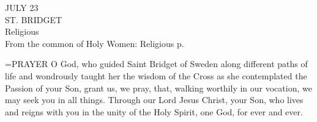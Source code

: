 \begin{center}\normalsize JULY 23\\
\footnotesize ST. BRIDGET\\
\footnotesize Religious\\
\footnotesize From the common of Holy Women: Religious p. \\
\end{center}

\hangindent=\parindent \small{PRAYER 
O God, who guided Saint Bridget of Sweden
along different paths of life
and wondrously taught her the wisdom of the Cross
as she contemplated the Passion of your Son,
grant us, we pray,
that, walking worthily in our vocation,
we may seek you in all things.
Through our Lord Jesus Christ, your Son,
who lives and reigns with you in the unity of the Holy Spirit,
one God, for ever and ever.\\}
 
